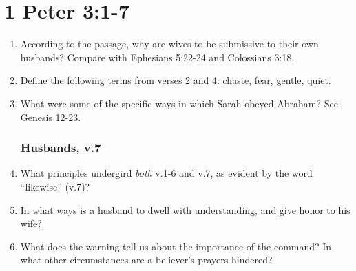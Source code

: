 \documentclass{article}
\newcommand{\answerbox}{\vspace{1.5cm}}
\newcommand{\BE}{\begin{enumerate}}
\newcommand{\EE}{\end{enumerate}}
\newcommand{\I}{\item}
\begin{document}
\part*{1 Peter 3:1-7}

\BE
\section*{Wives, v.1-6}
\I  According to the passage, why are wives to be submissive to their own
    husbands? Compare with Ephesians 5:22-24 and Colossians 3:18. \answerbox
\I  Define the following terms from verses 2 and 4: 
    chaste, fear, gentle, quiet. \answerbox
\I  What were some of the specific ways in which Sarah obeyed Abraham?
    See Genesis 12-23. \answerbox
\section*{Husbands, v.7}
\I  What principles undergird \emph{both} v.1-6 and v.7, as evident by the word 
    ``likewise'' (v.7)? \answerbox
\I  In what ways is a husband to dwell with understanding, and give honor
    to his wife? \answerbox
\I  What does the warning tell us about the importance of the command?
    In what other circumstances are a believer's prayers hindered? \answerbox
\EE
\end{document}
